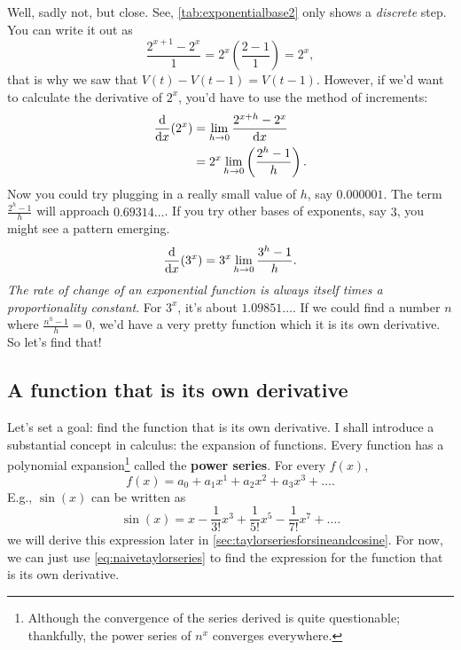 Well, sadly not, but close. See, \cref{tab:exponentialbase2} only shows a \emph{discrete} step. You can write it out as
\begin{equation}
    \frac{2^{x + 1} - 2^x}{1} = 2^x\left(\frac{2 - 1}{1}\right) = 2^x,
\end{equation}
that is why we saw that $V(t) - V(t - 1) = V(t - 1)$. However, if we'd want to calculate the derivative of $2^x$, you'd have to use the method of increments:
\begin{align*}
    \odv*{(2^x)}{x} &= \lim_{h \appr 0}\frac{2^{x + h} - 2^x}{\odif{x}} \\
    &= 2^x\lim_{h \appr 0}\left(\frac{2^h - 1}{h}\right).
\end{align*}
Now you could try plugging in a really small value of $h$, say $0.000001$. The term $\frac{2^h - 1}{h}$ will approach $0.69314\dots$. If you try other bases of exponents, say $3$, you might see a pattern emerging.
\begin{equation}
    \odv*{(3^x)}{x} = 3^x\lim_{h \appr 0}\frac{3^h - 1}{h}.
\end{equation}
\emph{The rate of change of an exponential function is always itself times a proportionality constant}. For $3^x$, it's about $1.09851\dots$. If we could find a number $n$ where $\frac{n^h - 1}{h} = 0$, we'd have a very pretty function which it is its own derivative. So let's find that!
 
\subsection{A function that is its own derivative}
\label{sec:afunctionthatisitsownderivative}

Let's set a goal: find the function that is its own derivative. I shall introduce a substantial concept in calculus: the expansion of functions. Every function has a polynomial expansion\footnote{Although the convergence of the series derived is quite questionable; thankfully, the power series of $n^x$ converges everywhere.} called the \textbf{power series}. For every $f(x)$,
\begin{equation}
    f(x) = a_0 + a_1x^1 + a_2x^2 + a_3x^3 +\dots. \label{eq:naivetaylorseries}
\end{equation}
E.g., $\sin(x)$ can be written as
\begin{equation}
    \sin(x) = x - \frac{1}{3!}x^3 + \frac{1}{5!}x^5 - \frac{1}{7!}x^7 + \dots. \label{eq:taylorseriessine}
\end{equation}
we will derive this expression later in \cref{sec:taylorseriesforsineandcosine}. For now, we can just use \cref{eq:naivetaylorseries} to find the expression for the function that is its own derivative.

